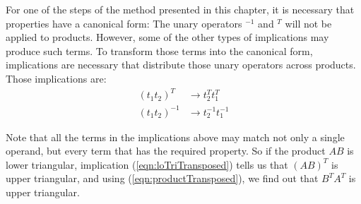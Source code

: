 \begin{enumerate}
For one of the steps of the method presented in this chapter, it is necessary that properties have a canonical form: The unary operators $^{-1}$ and $^{T}$ will not be applied to products. However, some of the other types of implications may produce such terms. To transform those terms into the canonical form, implications are necessary that distribute those unary operators across products. Those implications are:
%
\begin{align}
(t_1 t_2)^T &\rightarrow t_2^T t_1^T \label{eqn:productTransposed} \\
(t_1 t_2)^{-1} &\rightarrow t_2^{-1} t_1^{-1} 
\end{align}
%
\end{enumerate}
%
%
Note that all the terms in the implications above may match not only a single op\-er\-and, but every term that has the required property. So if the product $AB$ is lower triangular, implication (\ref{eqn:loTriTransposed}) tells us that $(AB)^T$ is upper triangular, and using (\ref{eqn:productTransposed}), we find out that $B^T A^T$ is upper triangular.

